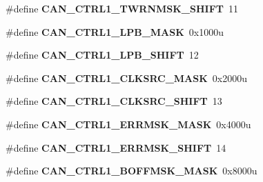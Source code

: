 \begin{DoxyCompactItemize}
\item 
\#define {\bfseries C\+A\+N\+\_\+\+C\+T\+R\+L1\+\_\+\+T\+W\+R\+N\+M\+S\+K\+\_\+\+S\+H\+I\+FT}~11\hypertarget{group__CAN__Register__Masks_gaf1bd84bad38306a14085dc57cb8728bf}{}\label{group__CAN__Register__Masks_gaf1bd84bad38306a14085dc57cb8728bf}

\item 
\#define {\bfseries C\+A\+N\+\_\+\+C\+T\+R\+L1\+\_\+\+L\+P\+B\+\_\+\+M\+A\+SK}~0x1000u\hypertarget{group__CAN__Register__Masks_ga6c3587074ec8b0646ec8c99f659bc90b}{}\label{group__CAN__Register__Masks_ga6c3587074ec8b0646ec8c99f659bc90b}

\item 
\#define {\bfseries C\+A\+N\+\_\+\+C\+T\+R\+L1\+\_\+\+L\+P\+B\+\_\+\+S\+H\+I\+FT}~12\hypertarget{group__CAN__Register__Masks_ga61cd46b497234d979cda54fa0952b848}{}\label{group__CAN__Register__Masks_ga61cd46b497234d979cda54fa0952b848}

\item 
\#define {\bfseries C\+A\+N\+\_\+\+C\+T\+R\+L1\+\_\+\+C\+L\+K\+S\+R\+C\+\_\+\+M\+A\+SK}~0x2000u\hypertarget{group__CAN__Register__Masks_ga24eac1a19c79f750c2ed88506155179d}{}\label{group__CAN__Register__Masks_ga24eac1a19c79f750c2ed88506155179d}

\item 
\#define {\bfseries C\+A\+N\+\_\+\+C\+T\+R\+L1\+\_\+\+C\+L\+K\+S\+R\+C\+\_\+\+S\+H\+I\+FT}~13\hypertarget{group__CAN__Register__Masks_gaba9b9a37df4f732cbd5b994aafe50eed}{}\label{group__CAN__Register__Masks_gaba9b9a37df4f732cbd5b994aafe50eed}

\item 
\#define {\bfseries C\+A\+N\+\_\+\+C\+T\+R\+L1\+\_\+\+E\+R\+R\+M\+S\+K\+\_\+\+M\+A\+SK}~0x4000u\hypertarget{group__CAN__Register__Masks_ga108c8ae37e8122ea29d48b9e68fbcc43}{}\label{group__CAN__Register__Masks_ga108c8ae37e8122ea29d48b9e68fbcc43}

\item 
\#define {\bfseries C\+A\+N\+\_\+\+C\+T\+R\+L1\+\_\+\+E\+R\+R\+M\+S\+K\+\_\+\+S\+H\+I\+FT}~14\hypertarget{group__CAN__Register__Masks_ga16b53de26664898f76f1cd545181782b}{}\label{group__CAN__Register__Masks_ga16b53de26664898f76f1cd545181782b}

\item 
\#define {\bfseries C\+A\+N\+\_\+\+C\+T\+R\+L1\+\_\+\+B\+O\+F\+F\+M\+S\+K\+\_\+\+M\+A\+SK}~0x8000u\hypertarget{group__CAN__Register__Masks_gafda1924bc397205b585b128187af9634}{}\label{group__CAN__Register__Masks_gafda1924bc397205b585b128187af9634}


\end{DoxyCompactItemize}
